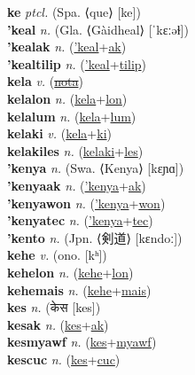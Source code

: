 \textbf{ke} \textit{ptcl.} (Spa. ⟨que⟩ [ke])
 \label{ke} \\
\textbf{'keal} \textit{n.} (Gla. ⟨Gàidheal⟩ [ˈkɛːəɫ])
 \label{'keal} \\
\textbf{'kealak} \textit{n.} (\hyperref['keal]{'keal}+\hyperref[ak]{ak})
 \label{'kealak} \\
\textbf{'kealtilip} \textit{n.} (\hyperref['keal]{'keal}+\hyperref[tilip]{tilip})
 \label{'kealtilip} \\
\textbf{kela} \textit{v.} (\hyperref[nota]{\sout{nota}})
 \label{kela} \\
\textbf{kelalon} \textit{n.} (\hyperref[kela]{kela}+\hyperref[lon]{lon})
 \label{kelalon} \\
\textbf{kelalum} \textit{n.} (\hyperref[kela]{kela}+\hyperref[lum]{lum})
 \label{kelalum} \\
\textbf{kelaki} \textit{v.} (\hyperref[kela]{kela}+\hyperref[ki]{ki})
 \label{kelaki} \\
\textbf{kelakiles} \textit{n.} (\hyperref[kelaki]{kelaki}+\hyperref[les]{les})
 \label{kelakiles} \\
\textbf{'kenya} \textit{n.} (Swa. ⟨Kenya⟩ [kɛɲɑ])
 \label{'kenya} \\
\textbf{'kenyaak} \textit{n.} (\hyperref['kenya]{'kenya}+\hyperref[ak]{ak})
 \label{'kenyaak} \\
\textbf{'kenyawon} \textit{n.} (\hyperref['kenya]{'kenya}+\hyperref[won]{won})
 \label{'kenyawon} \\
\textbf{'kenyatec} \textit{n.} (\hyperref['kenya]{'kenya}+\hyperref[tec]{tec})
 \label{'kenyatec} \\
\textbf{'kento} \textit{n.} (Jpn. ⟨剣道⟩ [kɛndoː])
 \label{'kento} \\
\textbf{kehe} \textit{v.} (ono. [kʰ])
 \label{kehe} \\
\textbf{kehelon} \textit{n.} (\hyperref[kehe]{kehe}+\hyperref[lon]{lon})
 \label{kehelon} \\
\textbf{kehemais} \textit{n.} (\hyperref[kehe]{kehe}+\hyperref[mais]{mais})
 \label{kehemais} \\
\textbf{kes} \textit{n.} ({\devanagari{}केस} [kes])
 \label{kes} \\
\textbf{kesak} \textit{n.} (\hyperref[kes]{kes}+\hyperref[ak]{ak})
 \label{kesak} \\
\textbf{kesmyawf} \textit{n.} (\hyperref[kes]{kes}+\hyperref[myawf]{myawf})
 \label{kesmyawf} \\
\textbf{kescuc} \textit{n.} (\hyperref[kes]{kes}+\hyperref[cuc]{cuc})
 \label{kescuc} \\
